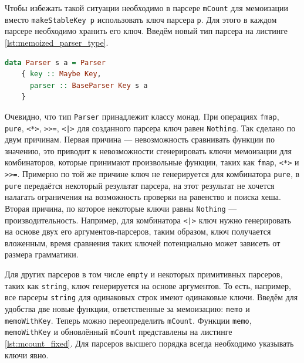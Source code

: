 \documentclass[times]{itmo-student-thesis}
\begin{document}
Чтобы избежать такой ситуации необходимо в парсере \lstinline{mCount} для мемоизации вместо \lstinline{makeStableKey p}
использовать ключ парсера \lstinline{p}. Для этого в каждом парсере необходимо хранить его ключ. Введём новый тип парсера на листинге \ref{lst:memoized_parser_type}. 

\begin{lstlisting}[language=Haskell,float=!h,caption={Тип парсера с ключом},label={lst:memoized_parser_type}]
  data Parser s a = Parser
    { key :: Maybe Key,
      parser :: BaseParser Key s a
    }
\end{lstlisting}

Очевидно, что тип \lstinline{Parser} принадлежит классу монад. При операциях \lstinline{fmap},
\lstinline{pure}, \lstinline{<*>}, \lstinline{>>=}, \lstinline{<|>} для созданного парсера
ключ равен \lstinline{Nothing}. Так сделано по двум причинам. Первая причина --- невозможность сравнивать функции по
значению, это приводит к невозможности сгенерировать ключи мемоизации для комбинаторов, которые принимают произвольные
функции, таких как \lstinline{fmap}, \lstinline{<*>} и \lstinline{>>=}. Примерно по той же причине ключ не
генерируется для  комбинатора \lstinline{pure}, в \lstinline{pure} передаётся некоторый результат парсера, на этот
результат не хочется налагать ограничения на возможность проверки на равенство и поиска хеша. Вторая причина, по
которое некоторые ключи равны \lstinline{Nothing} --- производительность. Например, для комбинатора \lstinline{<|>}
ключ нужно генерировать на основе двух его аргументов-парсеров, таким образом, ключ получается вложенным, время сравнения таких ключей потенциально 
может зависеть от размера грамматики. 

Для других парсеров в том числе \lstinline{empty} и некоторых примитивных парсеров, таких как
\lstinline{string}, ключ генерируется на основе аргументов. То есть, например, все парсеры \lstinline{string} для
одинаковых строк имеют одинаковые ключи. Введём для удобства две новые функции, ответственные за мемоизацию:
\lstinline{memo} и \lstinline{memoWithKey}. Теперь можно переопределить
\lstinline{mCount}. Функции \lstinline{memo}, \lstinline{memoWithKey} и обновлённый \lstinline{mCount} представлены на
листинге \ref{lst:mcount_fixed}. Для парсеров высшего порядка всегда необходимо указывать ключи явно.
\end{document}
